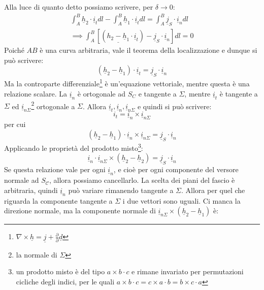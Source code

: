 \documentclass{book}
\begin{document}
        Alla luce di quanto detto possiamo scrivere, per $\delta \to 0$:
        \begin{align}
            \int_{A} ^{B} \underline{h}_{2} \cdot \underline{i}_{t}dl - \int_{A} ^{B} \underline{h}_{1} \cdot \underline{i}_{t}dl = \int_{A} ^{B} \underline{j}_{S} \cdot \underline{i}_{n} dl \\ \implies
            \int_{A} ^{B} [(\underline{h_{2}-\underline{h}_{1}}\cdot \underline{i}_{t})-\underline{j}_{S}\cdot \underline{i}_{n}]dl = 0
        \end{align}
        Poiché $AB$ è una curva arbitraria, vale il teorema della localizzazione e dunque si può scrivere:
        \begin{equation}
            (\underline{h}_{2}-\underline{h}_{1}) \cdot \underline{i}_{t} = \underline{j}_{S} \cdot \underline{i}_{n}
        \end{equation}
        Ma la controparte differenziale\footnote{$\nabla \times \underline{h} = \underline{j} + \frac{\partial}{\partial} \underline{d}$} è un'equazione vettoriale, mentre questa è una relazione scalare. La $\underline{i}_{n}$ è ortogonale ad $S_{C}$ e tangente a $\Sigma$, mentre $\underline{i}_{t}$ è tangente a $\Sigma$ ed $\underline{i}_{n\Sigma}$\footnote{la normale di $\Sigma$} ortogonale a $\Sigma$. Allora $\underline{i}_{t}, \underline{i}_{n}, \underline{i}_{n\Sigma}$ e quindi si può scrivere:
        \begin{equation}
            i_{t} = \underline{i}_{n} \times \underline{i}_{n\Sigma}
        \end{equation}
        per cui
        \begin{equation}
            (\underline{h}_{2}-\underline{h}_{1}) \cdot \underline{i}_{n} \times \underline{i}_{n\Sigma} = \underline{j}_{S} \cdot \underline{i}_{n}
        \end{equation}
        Applicando le proprietà del prodotto misto\footnote{un prodotto misto è del tipo $a \times b \cdot c$ e rimane invariato per permutazioni cicliche degli indici, per le quali $a \times b \cdot c = c \times a \cdot b = b \times c \cdot a$}:
        \begin{equation}
            \underline{i}_{n} \cdot \underline{i}_{n \Sigma} \times (\underline{h}_{2}-\underline{h}_{2}) = \underline{j}_{S} \cdot \underline{i}_{n}
        \end{equation}
        Se questa relazione vale per ogni $\underline{i}_{n}$, e cioè per ogni componente del versore normale ad $S_{\mathcal{C}}$, allora possiamo cancellarlo. La scelta dei piani del fascio è arbitraria, quindi $\underline{i}_{n}$ può variare rimanendo tangente a $\Sigma$. Allora per quel che riguarda la componente tangente a $\Sigma$ i due vettori sono uguali. Ci manca la direzione normale, ma la componente normale di $\underline{i}_{n\Sigma} \times (\underline{h}_{2}-\underline{h}_{1})$ è:
\end{document}
